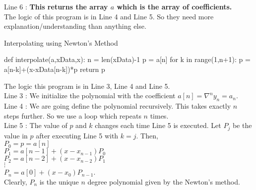 \begin{commentary}
	Line 6 : \textbf{This returns the array $a$ which is the array of coefficients.}\\

	The logic of this program is in Line 4 and Line 5. So they need more explanation/understanding than anything else.
\end{commentary}

\begin{program}Interpolating using Newton's Method
	\begin{python}
		def interpolate(a,xData,x):
			n = len(xData)-1
			p = a[n]
			for k in range(1,n+1):
				p = a[n-k]+(x-xData[n-k])*p
			return p
	\end{python}
	The logic this program is in Line 3, Line 4 and Line 5.\\

	Line 3 : We initialize the polynomial with the coefficient $a[n] = \nabla^n y_n = a_n$.\\

	Line 4 : We are going define the polynomial recursively. This takes exactly $n$ steps further. So we use a loop which repeats $n$ times.\\

	Line 5 : The value of $p$ and $k$ changes each time Line 5 is executed. Let $P_j$ be the value in $p$ after executing Line 5 with $k=j$. Then,\\ $P_0 = p = a[n]$\\ $P_1 = a[n-1]+(x-x_{n-1})P_0$\\ $P_2 = a[n-2]+(x-x_{n-2})P_1$\\ $\vdots$\\ $P_n = a[0]+(x-x_0)P_{n-1}$.\\ Clearly, $P_n$ is the unique $n$ degree polynomial given by the Newton's method.
\end{program}

